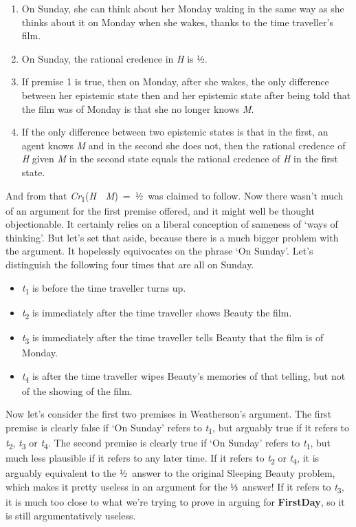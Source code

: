 \documentclass[
  10pt,
  letterpaper,
  DIV=11,
  numbers=noendperiod,
  twoside]{scrartcl}
\providecommand{\tightlist}{%
  \setlength{\itemsep}{0pt}\setlength{\parskip}{0pt}}\usepackage{longtable,booktabs,array}
\begin{document}
\begin{enumerate}
\def\labelenumi{\arabic{enumi}.}
\tightlist
\item
  On Sunday, she can think about her Monday waking in the same way as
  she thinks about it on Monday when she wakes, thanks to the time
  traveller's film.
\item
  On Sunday, the rational credence in \emph{H} is ½.
\item
  If premise 1 is true, then on Monday, after she wakes, the only
  difference between her epistemic state then and her epistemic state
  after being told that the film was of Monday is that she no longer
  knows \emph{M}.
\item
  If the only difference between two epistemic states is that in the
  first, an agent knows \emph{M} and in the second she does not, then
  the rational credence of \emph{H} given \emph{M} in the second state
  equals the rational credence of \emph{H} in the first state.
\end{enumerate}

And from that
\emph{Cr}\textsubscript{1}(\emph{H}~\textbar~\emph{M})~=~½~was claimed
to follow. Now there wasn't much of an argument for the first premise
offered, and it might well be thought objectionable. It certainly relies
on a liberal conception of sameness of `ways of thinking'. But let's set
that aside, because there is a much bigger problem with the argument. It
hopelessly equivocates on the phrase `On Sunday'. Let's distinguish the
following four times that are all on Sunday.

\begin{itemize}
\tightlist
\item
  \emph{t}\textsubscript{1} is before the time traveller turns up.
\item
  \emph{t}\textsubscript{2} is immediately after the time traveller
  shows Beauty the film.
\item
  \emph{t}\textsubscript{3} is immediately after the time traveller
  tells Beauty that the film is of Monday.
\item
  \emph{t}\textsubscript{4} is after the time traveller wipes Beauty's
  memories of that telling, but not of the showing of the film.
\end{itemize}

Now let's consider the first two premises in Weatherson's argument. The
first premise is clearly false if `On Sunday' refers to
\emph{t}\textsubscript{1}, but arguably true if it refers to
\emph{t}\textsubscript{2}, \emph{t}\textsubscript{3} or
\emph{t}\textsubscript{4}. The second premise is clearly true if `On
Sunday' refers to \emph{t}\textsubscript{1}, but much less plausible if
it refers to any later time. If it refers to \emph{t}\textsubscript{2}
or \emph{t}\textsubscript{4}, it is arguably equivalent to the ½~answer
to the original Sleeping Beauty problem, which makes it pretty useless
in an argument for the ⅓~answer! If it refers to
\emph{t}\textsubscript{3}, it is much too close to what we're trying to
prove in arguing for \textbf{FirstDay}, so it is still argumentatively
useless.
\end{document}
